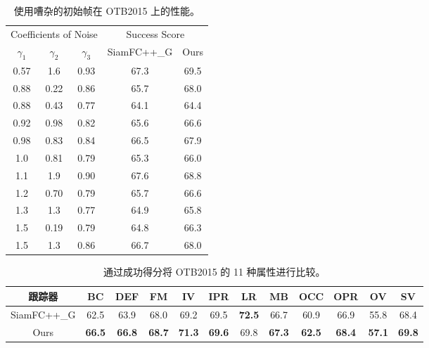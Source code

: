 \begin{table}[t]
\centering
\caption{使用嘈杂的初始帧在 OTB2015 上的性能。}
\begin{tabular}{c c c c c}
\toprule
\multicolumn{3}{c}{Coefficients of Noise} & \multicolumn{2}{c}{Success Score} \\
\cmidrule(lr){1-3} \cmidrule(lr){4-5}
$\gamma_1$ & $\gamma_2$ & $\gamma_3$  & SiamFC++\_G & Ours  \\
\midrule
0.57  &	1.6	 & 0.93	& 67.3    & 69.5 \\
0.88  & 0.22 & 0.86 & 65.7    & 68.0 \\
0.88  & 0.43 & 0.77 & 64.1    & 64.4 \\
0.92  & 0.98 & 0.82 & 65.6    & 66.6 \\
0.98  & 0.83 & 0.84 & 66.5    & 67.9 \\
1.0   & 0.81 & 0.79 & 65.3    & 66.0 \\
1.1   &	1.9  & 0.90	& 67.6    & 68.8 \\
1.2   & 0.70 & 0.79 & 65.7    & 66.6 \\
1.3   & 1.3  & 0.77 & 64.9    & 65.8 \\
1.5   & 0.19 & 0.79 & 64.8    & 66.3 \\
1.5   & 1.3  & 0.86 & 66.7    & 68.0 \\
\bottomrule
\end{tabular}
\label{table:noise}
\end{table}

\begin{table}[t]
\centering
\caption{通过成功得分将 OTB2015 的 11 种属性进行比较。}
\begin{tabular}{c c c c c c c c c c c c}
\toprule
跟踪器 & BC & DEF & FM            & IV            & IPR           & LR    & MB    & OCC   & OPR   & OV    & SV    \\
\midrule
SiamFC++\_G  &  62.5 & 63.9 & 68.0          & 69.2          & 69.5          & \textbf{72.5}  & 66.7 & 60.9 & 66.9 & 55.8 & 68.4 \\
Ours        & \textbf{66.5} & \textbf{66.8} & \textbf{68.7} & \textbf{71.3} & \textbf{69.6} & 69.8  & \textbf{67.3} & \textbf{62.5} & \textbf{68.4} & \textbf{57.1} & \textbf{69.8} \\
\bottomrule
\end{tabular}
\label{table:attr}
\end{table}


